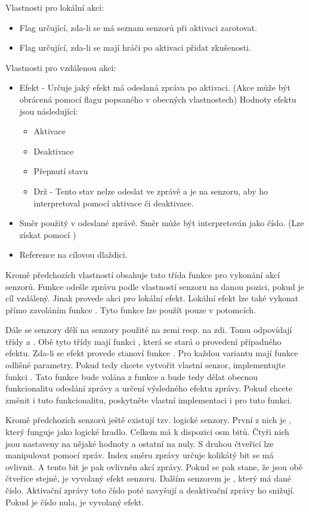 Vlastnosti pro lokální akci:
\begin{itemize}
\item Flag určující, zda-li se má seznam senzorů při aktivaci zarotovat.
\item Flag určující, zda-li se mají hráči po aktivaci přidat zkušenosti.
\end{itemize}

Vlastnosti pro vzdálenou akci:
\begin{itemize}
\item Efekt - Určuje jaký efekt má odeslaná zpráva po aktivaci. (Akce může být obrácená pomocí flagu popsaného v obecných vlastnostech)
	Hodnoty efektu jsou následující:
	\begin{itemize}
	\item Aktivace 
	\item Deaktivace
	\item Přepnutí stavu
	\item Drž - Tento stav nelze odeslat ve zprávě a je na senzoru, aby ho interpretoval pomocí aktivace či deaktivace.
	\end{itemize}
\item Směr použitý v odeslané zprávě. Směr může být interpretován jako číslo. (Lze získat pomocí )
\item Reference na cílovou dlaždici.
\end{itemize}

Kromě předchozích vlastností obsahuje tato třída funkce pro vykonání akcí senzorů. Funkce   odešle zprávu 
podle vlastností senzoru na danou pozici, pokud je cíl vzdálený. Jinak provede akci pro lokální efekt. Lokální efekt lze 
také vykonat přímo zavoláním funkce . Tyto funkce lze použít pouze v potomcích.

Dále se senzory dělí na senzory použité na zemi resp. na zdi. Tomu odpovídají třídy   a .
Obě tyto třídy mají funkci , která se stará o provedení případného efektu. Zda-li se efekt provede stanoví
funkce . Pro každou variantu mají funkce odlišné parametry. Pokud tedy chcete vytvořit vlastní senzor,
implementujte funkci . Tato funkce bude volána z funkce  a bude tedy dělat obecnou funkcionalitu 
odeslání zprávy a určení výsledného efektu zprávy. Pokud chcete změnit i tuto funkcionalitu, poskytněte vlastní implementaci 
i pro tuto funkci.

Kromě předchozích senzorů ještě existují tzv. logické senzory. První z nich je , který funguje 
jako logické hradlo. Celkem má k dispozici osm bitů. Čtyři  nich jsou nastaveny na nějaké hodnoty a ostatní na nuly. 
S druhou čtveřicí lze manipulovat pomocí zpráv. Index směru zprávy určuje kolikátý bit se má ovlivnit. A tento bit
je pak ovlivněn akcí zprávy. Pokud se pak stane, že jsou obě čtveřice stejné, je vyvolaný efekt senzoru. Dalším
senzorem je , který má dané číslo. Aktivační zprávy toto číslo poté navyšují a deaktivační zprávy
ho snižují. Pokud je číslo  nula, je vyvolaný efekt.
 

